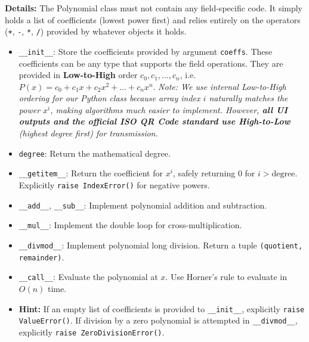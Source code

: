 \textbf{Details:} 
The Polynomial class must not contain any field-specific code. It simply holds a list of coefficients (lowest power first) and relies entirely on the operators (\lstinline|+|, \lstinline|-|, \lstinline|*|, \lstinline|/|) provided by whatever objects it holds.
\begin{itemize}
    \item \lstinline|__init__|: Store the coefficients provided by argument \lstinline|coeffs|. These coefficients can be any type that supports the field operations. They are provided in \textbf{Low-to-High} order $c_0, c_1, \ldots, c_n$, i.e. $P(x) = c_0 + c_1x + c_2x^2 + \ldots + c_nx^n$. \textit{Note: We use internal Low-to-High ordering for our Python class because array index $i$ naturally matches the power $x^i$, making algorithms much easier to implement. However, \textbf{all UI outputs and the official ISO QR Code standard use High-to-Low} (highest degree first) for transmission.}
    \item \lstinline|degree|: Return the mathematical degree.
    \item \lstinline|__getitem__|: Return the coefficient for $x^i$, safely returning 0 for $i > \text{degree}$. Explicitly \lstinline|raise IndexError()| for negative powers.
    \item \lstinline|__add__|, \lstinline|__sub__|: Implement polynomial addition and subtraction.
    \item \lstinline|__mul__|: Implement the double loop for cross-multiplication.
    \item \lstinline|__divmod__|: Implement polynomial long division. Return a tuple \lstinline|(quotient, remainder)|.
    \item \lstinline|__call__|: Evaluate the polynomial at $x$. Use Horner's rule to evaluate in $O(n)$ time.
    \item \textbf{Hint:} If an empty list of coefficients is provided to \lstinline|__init__|, explicitly \lstinline|raise ValueError()|. If division by a zero polynomial is attempted in \lstinline|__divmod__|, explicitly \lstinline|raise ZeroDivisionError()|.
\end{itemize}

